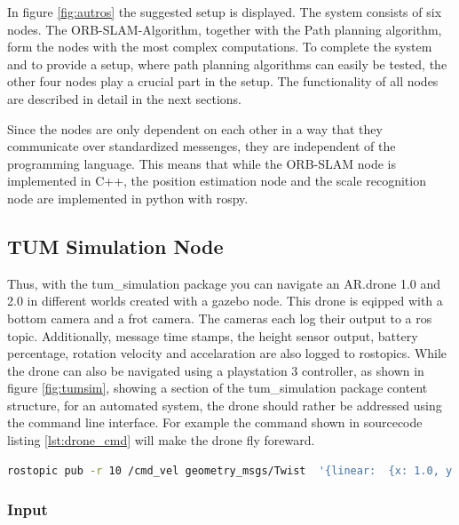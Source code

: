 	In figure \ref{fig:autros} the suggested setup is displayed. The system consists of six nodes. The ORB-SLAM-Algorithm, together with the Path planning algorithm, 
	form the nodes with the most complex computations. To complete the system and to provide a setup, where path planning algorithms can easily be tested, 
	the other four nodes play a crucial part in the setup.	The functionality of all nodes are described in detail in the next sections. 
	
	
	Since the nodes are only dependent on each other in a way that they communicate over standardized messenges, they are independent of the programming language. 
	This means that while the ORB-SLAM node is implemented in C++, the position estimation node and the scale recognition node are implemented in python with rospy. 
	
	\subsection{TUM Simulation Node}
	
	Thus, with the tum\_simulation package you can navigate an AR.drone 1.0 and 2.0 in different worlds created with a gazebo node. This drone is eqipped with a bottom camera 
	and a frot camera. The cameras each log their output to a ros topic. Additionally, message time stamps, the height sensor output, 
	battery percentage, rotation
	velocity and accelaration are also logged to rostopics. While the drone can also be navigated using a playstation 3 controller, as shown in figure 
	\ref{fig:tumsim}, showing a section of the tum\_simulation package content structure, 
	for an automated system, the drone should rather be addressed using the command line interface. For example 
	the command shown in sourcecode listing \ref{lst:drone_cmd} will make the drone fly foreward. 
	
	\begin{lstlisting}[language=bash, caption=drone navigation command, label=lst:drone_cmd]
    rostopic pub -r 10 /cmd_vel geometry_msgs/Twist  '{linear:  {x: 1.0, y: 0.0, z: 0.0}, angular: {x: 0.0,y: 0.0,z: 0.0}}'
	\end{lstlisting}
	
	
	\subsubsection{Input}
	
